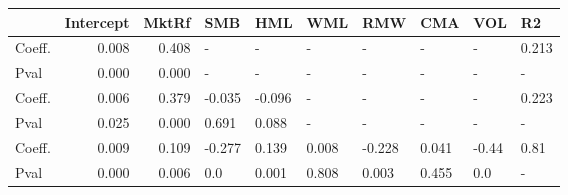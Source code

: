 \begin{tabular}{lrrlllllll}
\toprule
{} &  Intercept &  MktRf &    SMB &    HML &    WML &    RMW &    CMA &   VOL &     R2 \\
\midrule
Coeff.  &      0.008 &  0.408 &      - &      - &      - &      - &      - &     - &  0.213 \\
Pval    &      0.000 &  0.000 &      - &      - &      - &      - &      - &     - &      - \\
Coeff.  &      0.006 &  0.379 & -0.035 & -0.096 &      - &      - &      - &     - &  0.223 \\
Pval    &      0.025 &  0.000 &  0.691 &  0.088 &      - &      - &      - &     - &      - \\
Coeff.  &      0.009 &  0.109 & -0.277 &  0.139 &  0.008 & -0.228 &  0.041 & -0.44 &   0.81 \\
Pval    &      0.000 &  0.006 &    0.0 &  0.001 &  0.808 &  0.003 &  0.455 &   0.0 &      - \\
\bottomrule
\end{tabular}
